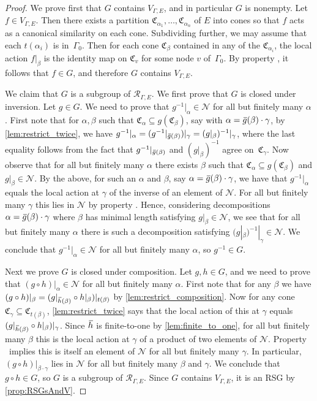 \documentclass[11pt,letterpaper]{amsart}
\theoremstyle{definition}
\newcommand{\R}{\mathcal{R}}
\newcommand{\Nuc}{\mathcal{N}}
\newcommand{\C}{\mathfrak{C}}
\newcommand{\og}{\mkern 2mu\overline{\mkern-2mu g\mkern0.5mu}\mkern-0.5mu}
\newcommand{\oh}{\mkern 2mu\overline{\mkern-2mu h\mkern-0.25mu}\mkern 0.25mu}
\begin{document}
\begin{proof}
We prove first that $G$ contains $V_{\Gamma,E}$, and in particular $G$ is nonempty. Let $f\in V_{\Gamma,E}$.  Then there exists a partition $\C_{\alpha_1},\ldots,\C_{\alpha_n}$ of $E$ into cones so that $f$ acts as a canonical similarity on each cone.  Subdividing further, we may assume that each $t(\alpha_i)$ is in~$\Gamma_0$.  Then for each cone $\C_\beta$ contained in any of the $\C_{\alpha_i}$, the local action $f|_\beta$ is the identity map on $\C_v$ for some node $v$ of~$\Gamma_0$.  By property \IdNuc, it follows that $f\in G$, and therefore $G$ contains $V_{\Gamma,E}$.

We claim that $G$ is a subgroup of $\R_{\Gamma,E}$. We first prove that $G$ is closed under inversion.  Let $g\in G$.  We need to prove that $g^{-1}|_\alpha \in\Nuc$ for all but finitely many $\alpha$. First note that for $\alpha,\beta$ such that $\C_\alpha \subseteq g(\C_\beta)$, say with $\alpha=\og(\beta)\cdot\gamma$, by \cref{lem:restrict_twice}, we have $g^{-1}|_\alpha = (g^{-1}|_{\og(\beta)})|_{\gamma} = (g|_\beta)^{-1}|_\gamma$, where the last equality follows from the fact that $g^{-1}|_{\og(\beta)}$ and $(g|_\beta)^{-1}$ agree on~$\C_\gamma$. Now observe that for all but finitely many $\alpha$ there exists $\beta$ such that $\C_\alpha\subseteq g(\C_\beta)$ and $g|_\beta\in\Nuc$. By the above, for such an $\alpha$ and $\beta$, say $\alpha=\og(\beta)\cdot\gamma$, we have that $g^{-1}|_\alpha$ equals the local action at $\gamma$ of the inverse of an element of $\Nuc$. For all but finitely many $\gamma$ this lies in $\Nuc$ by property \InvNuc. Hence, considering decompositions $\alpha=\og(\beta)\cdot\gamma$ where $\beta$ has minimal length satisfying $g|_\beta\in\Nuc$, we see that for all but finitely many $\alpha$ there is such a decomposition satisfying $(g|_\beta)^{-1}|_\gamma \in\Nuc$. We conclude that $g^{-1}|_\alpha \in \Nuc$ for all but finitely many $\alpha$, so $g^{-1}\in G$.

Next we prove $G$ is closed under composition. Let $g,h\in G$, and we need to prove that $(g\circ h)|_\alpha\in\Nuc$ for all but finitely many $\alpha$. First note that for any $\beta$ we have $(g\circ h)|_\beta = (g|_{\oh(\beta)}\circ h|_\beta)|_{t(\beta)}$ by \cref{lem:restrict_composition}. Now for any cone $\C_\gamma\subseteq \C_{t(\beta)}$, \cref{lem:restrict_twice} says that the local action of this at $\gamma$ equals $(g|_{\oh(\beta)}\circ h|_\beta)|_\gamma$. Since $\oh$ is finite-to-one by \cref{lem:finite_to_one}, for all but finitely many $\beta$ this is the local action at $\gamma$ of a product of two elements of $\Nuc$. Property \ProdNuc\ implies this is itself an element of $\Nuc$ for all but finitely many $\gamma$. In particular, $(g\circ h)|_{\beta\cdot\gamma}$ lies in $\Nuc$ for all but finitely many $\beta$ and $\gamma$. We conclude that $g\circ h \in G$, so $G$ is a subgroup of $\R_{\Gamma,E}$.  Since $G$ contains $V_{\Gamma,E}$, it is an RSG by \cref{prop:RSGsAndV}.


\end{proof}
\end{document}
